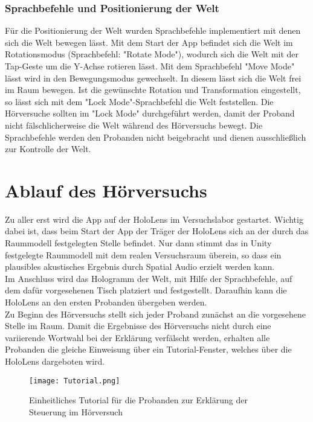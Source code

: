  \subsubsection{Sprachbefehle und Positionierung der Welt}
 Für die Positionierung der Welt wurden Sprachbefehle implementiert mit denen sich die Welt bewegen lässt. Mit dem Start der App befindet sich die Welt im Rotationsmodus (Sprachbefehl: "Rotate Mode"), wodurch sich die Welt mit der Tap-Geste um die Y-Achse rotieren lässt. Mit dem Sprachbefehl "Move Mode" lässt wird in den Bewegungsmodus gewechselt. In diesem lässt sich die Welt frei im Raum bewegen. Ist die gewünschte Rotation und Transformation eingestellt, so lässt sich mit dem "Lock Mode"-Sprachbefehl die Welt feststellen. Die Hörversuche sollten im "Lock Mode" durchgeführt werden, damit der Proband nicht fälschlicherweise die Welt während des Hörversuchs bewegt. Die Sprachbefehle werden den Probanden nicht beigebracht und dienen ausschließlich zur Kontrolle der Welt.
  
 \section{Ablauf des Hörversuchs}
 Zu aller erst wird die App auf der HoloLens im Versuchslabor gestartet. Wichtig dabei ist, dass beim Start der App der Träger der HoloLens sich an der durch das Raummodell festgelegten Stelle befindet. Nur dann stimmt das in Unity festgelegte Raummodell mit dem realen Versuchsraum überein, so dass ein plausibles akustisches Ergebnis durch Spatial Audio erzielt werden kann. \\
 
 Im Anschluss wird das Hologramm der Welt, mit Hilfe der Sprachbefehle, auf dem dafür vorgesehenen Tisch platziert und festgestellt. Daraufhin kann die HoloLens an den ersten Probanden übergeben werden. \\
 
Zu Beginn des Hörversuchs stellt sich jeder Proband zunächst an die vorgesehene Stelle im Raum. Damit die Ergebnisse des Hörversuchs nicht durch eine variierende Wortwahl bei der Erklärung verfälscht werden, erhalten alle Probanden die gleiche Einweisung über ein Tutorial-Fenster, welches über die HoloLens dargeboten wird.  \\

 \begin{figure}[H]
\centering
\texttt{[image: Tutorial.png]}
\caption{Einheitliches Tutorial für die Probanden zur Erklärung der Steuerung im Hörversuch}
\label{fig:Tutorial}
\end{figure} 

